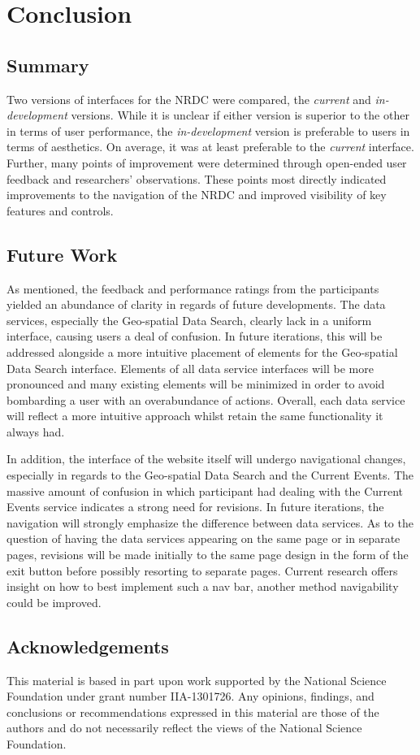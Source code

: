 \documentclass{acm_proc_article-sp}
\begin{document}
%
%
\section{Conclusion}
%
\subsection{Summary}
Two versions of interfaces for the NRDC were compared, the \emph{current} and \emph{in-development} versions. While it is unclear if either version is superior to the other in terms of user performance, the \emph{in-development} version is preferable to users in terms of aesthetics. On average, it was at least preferable to the \emph{current} interface. Further, many points of improvement were determined through open-ended user feedback and researchers' observations. These points most directly indicated improvements to the navigation of the NRDC and improved visibility of key features and controls.

%
\subsection{Future Work}
As mentioned, the feedback and performance ratings from the participants yielded an abundance of clarity in regards of future developments. The data services, especially the Geo-spatial Data Search, clearly lack in a uniform interface, causing users a deal of confusion. In future iterations, this will be addressed alongside a more intuitive placement of elements for the Geo-spatial Data Search interface. Elements of all data service interfaces will be more pronounced and many existing elements will be minimized in order to avoid bombarding a user with an overabundance of actions. Overall, each data service will reflect a more intuitive approach whilst retain the same functionality it always had.

In addition, the interface of the website itself will undergo navigational changes, especially in regards to the Geo-spatial Data Search and the Current Events. The massive amount of confusion in which participant had dealing with the Current Events service indicates a strong need for revisions. In future iterations, the navigation will strongly emphasize the difference between data services. As to the question of having the data services appearing on the same page or in separate pages, revisions will be made initially to the same page design in the form of the exit button before possibly resorting to separate pages. Current research offers insight on how to best implement such a nav bar\cite{horizontal_nav_bar}, another method navigability could be improved.
%
\subsection{Acknowledgements}
This material is based in part upon work supported by the National Science Foundation under grant number IIA-1301726. Any opinions, findings, and conclusions or recommendations expressed in this material are those of the authors and do not necessarily reflect the views of the National Science Foundation. 




\end{document}
